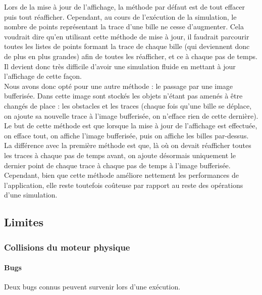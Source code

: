 \documentclass{report}
\begin{document}
Lors de la mise à jour de l’affichage, la méthode par défaut est de tout effacer puis tout réafficher. Cependant, au cours de l’exécution de la simulation, le nombre de points représentant la trace d’une bille ne cesse d’augmenter. Cela voudrait dire qu’en utilisant cette méthode de mise à jour, il faudrait parcourir toutes les listes de points formant la trace de chaque bille (qui deviennent donc de plus en plus grandes) afin de toutes les réafficher, et ce à chaque pas de temps. Il devient donc très difficile d’avoir une simulation fluide en mettant à jour l’affichage de cette façon. \\

Nous avons donc opté pour une autre méthode : le passage par une image bufferisée. Dans cette image sont stockés les objets n’étant pas amenés à être changés de place : les obstacles et les traces (chaque fois qu’une bille se déplace, on ajoute sa nouvelle trace à l’image bufferisée, on n’efface rien de cette dernière). \\

Le but de cette méthode est que lorsque la mise à jour de l’affichage est effectuée, on efface tout, on affiche l’image bufferisée, puis on affiche les billes par-dessus. La différence avec la première méthode est que, là où on devait réafficher toutes les traces à chaque pas de temps avant, on ajoute désormais uniquement le dernier point de chaque trace à chaque pas de temps à l’image bufferisée. \\

Cependant, bien que cette méthode améliore nettement les performances de l’application, elle reste toutefois coûteuse par rapport au reste des opérations d’une simulation.

\newpage
\subsection{Limites}

\subsubsection{Collisions du moteur physique}

\paragraph{Bugs}

Deux bugs connus peuvent survenir lors d’une exécution. \\
\end{document}
